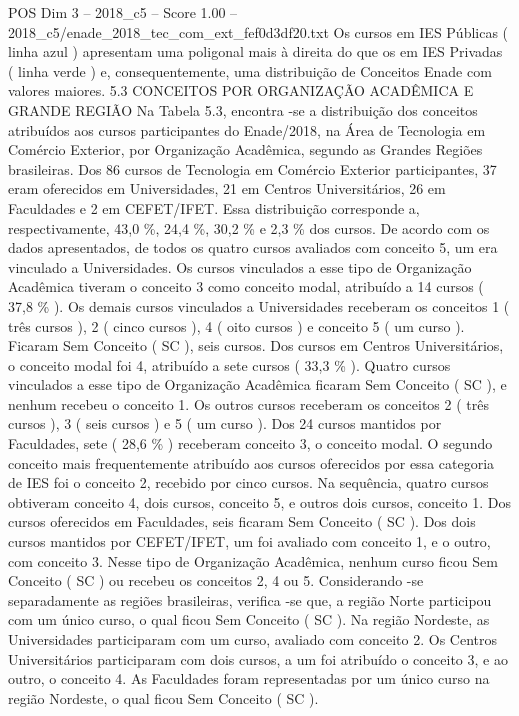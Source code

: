 \begin{textsample}{POS Dim 3 – 2018\_c5 – Score 1.00 – 2018\_c5/enade\_2018\_tec\_com\_ext\_fef0d3df20.txt}
Os cursos em IES Públicas ( linha azul ) apresentam uma poligonal mais à direita do que os em IES Privadas ( linha verde ) e, consequentemente, uma distribuição de Conceitos Enade com valores maiores. 5.3 CONCEITOS POR ORGANIZAÇÃO ACADÊMICA E GRANDE REGIÃO Na Tabela 5.3, encontra -se a distribuição dos conceitos atribuídos aos cursos participantes do Enade/2018, na Área de Tecnologia em Comércio Exterior, por Organização Acadêmica, segundo as Grandes Regiões brasileiras.
Dos 86 cursos de Tecnologia em Comércio Exterior participantes, 37 eram oferecidos em Universidades, 21 em Centros Universitários, 26 em Faculdades e 2 em CEFET/IFET.
Essa distribuição corresponde a, respectivamente, 43,0 \%, 24,4 \%, 30,2 \% e 2,3 \% dos cursos.
De acordo com os dados apresentados, de todos os quatro cursos avaliados com conceito 5, um era vinculado a Universidades.
Os cursos vinculados a esse tipo de Organização Acadêmica tiveram o conceito 3 como conceito modal, atribuído a 14 cursos ( 37,8 \% ).
Os demais cursos vinculados a Universidades receberam os conceitos 1 ( três cursos ), 2 ( cinco cursos ), 4 ( oito cursos ) e conceito 5 ( um curso ).
Ficaram Sem Conceito ( SC ), seis cursos.
Dos cursos em Centros Universitários, o conceito modal foi 4, atribuído a sete cursos ( 33,3 \% ).
Quatro cursos vinculados a esse tipo de Organização Acadêmica ficaram Sem Conceito ( SC ), e nenhum recebeu o conceito 1.
Os outros cursos receberam os conceitos 2 ( três cursos ), 3 ( seis cursos ) e 5 ( um curso ).
Dos 24 cursos mantidos por Faculdades, sete ( 28,6 \% ) receberam conceito 3, o conceito modal.
O segundo conceito mais frequentemente atribuído aos cursos oferecidos por essa categoria de IES foi o conceito 2, recebido por cinco cursos.
Na sequência, quatro cursos obtiveram conceito 4, dois cursos, conceito 5, e outros dois cursos, conceito 1.
Dos cursos oferecidos em Faculdades, seis ficaram Sem Conceito ( SC ).
Dos dois cursos mantidos por CEFET/IFET, um foi avaliado com conceito 1, e o outro, com conceito 3.
Nesse tipo de Organização Acadêmica, nenhum curso ficou Sem Conceito ( SC ) ou recebeu os conceitos 2, 4 ou 5.
Considerando -se separadamente as regiões brasileiras, verifica -se que, a região Norte participou com um único curso, o qual ficou Sem Conceito ( SC ).
Na região Nordeste, as Universidades participaram com um curso, avaliado com conceito 2.
Os Centros Universitários participaram com dois cursos, a um foi atribuído o conceito 3, e ao outro, o conceito 4.
As Faculdades foram representadas por um único curso na região Nordeste, o qual ficou Sem Conceito ( SC ).

\end{textsample}
